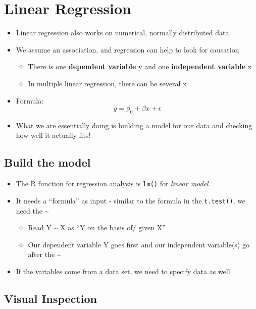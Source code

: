 \documentclass[
]{book}
\providecommand{\tightlist}{%
  \setlength{\itemsep}{0pt}\setlength{\parskip}{0pt}}
\begin{document}
\section{Linear Regression}\label{linear-regression}

\begin{itemize}
\tightlist
\item
  Linear regression also works on numerical, normally distributed data
\item
  We assume an association, and regression can help to look for causation

  \begin{itemize}
  \tightlist
  \item
    There is one \textbf{dependent variable} y and one \textbf{independent variable} x
  \item
    In multiple linear regression, there can be several x
  \end{itemize}
\item
  Formula: \[ y = \beta_0 + \beta x + \epsilon \]
\item
  What we are essentially doing is building a model for our data and checking how well it actually fits!
\end{itemize}

\subsection{Build the model}\label{build-the-model}

\begin{itemize}
\tightlist
\item
  The R function for regression analysis is \texttt{lm()} for \emph{linear model}
\item
  It needs a ``formula'' as input - similar to the formula in the \texttt{t.test()}, we need the \textasciitilde{}

  \begin{itemize}
  \tightlist
  \item
    Read Y \textasciitilde{} X as ``Y on the basis of/ given X''
  \item
    Our dependent variable Y goes first and our independent variable(s) go after the \textasciitilde{}
  \end{itemize}
\item
  If the variables come from a data set, we need to specify data as well
\end{itemize}

\subsection{Visual Inspection}\label{visual-inspection}
\end{document}
